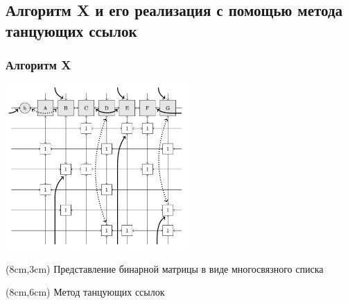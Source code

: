 \documentclass{beamer}
\begin{document}
\subsection{Алгоритм X и его реализация с помощью метода танцующих ссылок}
\begin{frame}
\frametitle{Алгоритм X}
\includegraphics[width=7cm]{algorithmX_example}
\begin{textblock*}{5cm}(8cm,3cm)
Представление бинарной матрицы в виде многосвязного списка
\end{textblock*}

\begin{textblock*}{5cm}(8cm,6cm)
Метод танцующих ссылок
\end{textblock*}


\end{frame}
\end{document}
